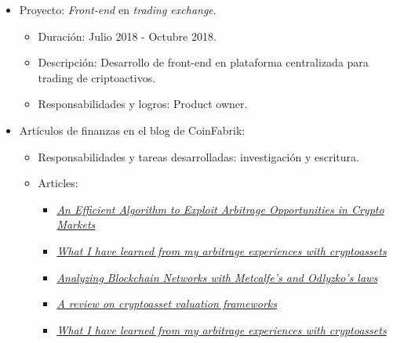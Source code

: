 \documentclass[11pt,a4paper,sans]{moderncv}        %
\begin{document}
{\begin{itemize}
\begin{itemize}
	\item Duración: Agosto 2018 - Octubre 2018.
	\item Descripción: Descentralización de Taringa!, la red social latinoamericana con ~500k usuarios activos diarios.
	\item esponsabilidades y tareas desarrolladas: Diseño de la descentralización general de la plataforma,
	incluyendo arquitectura, dinámica de token, incentivos y economía.
	\end{itemize}
\item Proyecto: \textit{Front-end} en \textit{trading exchange}.
	\begin{itemize}%
	\item Duración: Julio 2018 - Octubre 2018.
	\item Descripción: Desarrollo de front-end en plataforma centralizada para trading de criptoactivos.
	\item Responsabilidades y logros: Product owner.
	\end{itemize}
\item Artículos de finanzas en el blog de CoinFabrik:
	\begin{itemize}%
	\item Responsabilidades y tareas desarrolladas: investigación y escritura.
	\item Articles:
		\begin{itemize}
			\item \href{https://blog.coinfabrik.com/an-efficient-algorithm-to-exploit-arbitrage-opportunities-in-crypto-markets/}{\textit{An Efficient Algorithm to Exploit Arbitrage Opportunities in Crypto Markets}}
		\item \href{https://blog.coinfabrik.com/what-i-have-learned-from-my-arbitrage-experiences-with-cryptoassets/}{\textit{What I have learned from my arbitrage experiences with cryptoassets}}
		\item \href{https://blog.coinfabrik.com/analyzing-blockchain-networks-with-metcafes-and-odlyzkos-laws/}{\textit{Analyzing Blockchain Networks with Metcalfe’s and Odlyzko’s laws}}
		\item \href{https://blog.coinfabrik.com/a-review-on-cryptoasset-valuation-frameworks/}{\textit{A review on cryptoasset valuation frameworks}}
		\item \href{https://blog.coinfabrik.com/what-i-have-learned-from-my-arbitrage-experiences-with-cryptoassets/}{\textit{What I have learned from my arbitrage experiences with cryptoassets}}
		\end{itemize}	
	\end{itemize}
\end{itemize}
}
\end{document}
